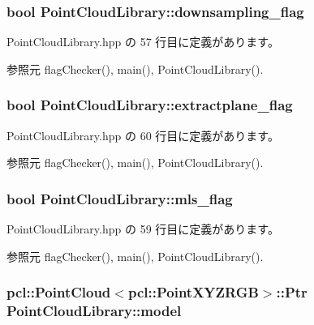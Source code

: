 \subsubsection[{downsampling\-\_\-flag}]{\setlength{\rightskip}{0pt plus 5cm}bool Point\-Cloud\-Library\-::downsampling\-\_\-flag}\label{class_point_cloud_library_a6bb70f323f325576a505c45edd1f2ebe}


 Point\-Cloud\-Library.\-hpp の 57 行目に定義があります。



参照元 flag\-Checker(), main(), Point\-Cloud\-Library().

\subsubsection[{extractplane\-\_\-flag}]{\setlength{\rightskip}{0pt plus 5cm}bool Point\-Cloud\-Library\-::extractplane\-\_\-flag}\label{class_point_cloud_library_a76c829d2feea3efcb84449a0c360ec43}


 Point\-Cloud\-Library.\-hpp の 60 行目に定義があります。



参照元 flag\-Checker(), main(), Point\-Cloud\-Library().

\subsubsection[{mls\-\_\-flag}]{\setlength{\rightskip}{0pt plus 5cm}bool Point\-Cloud\-Library\-::mls\-\_\-flag}\label{class_point_cloud_library_a0745fdcbdae44048793a4dce33dfeb4f}


 Point\-Cloud\-Library.\-hpp の 59 行目に定義があります。



参照元 flag\-Checker(), main(), Point\-Cloud\-Library().

\subsubsection[{model}]{\setlength{\rightskip}{0pt plus 5cm}pcl\-::\-Point\-Cloud$<$pcl\-::\-Point\-X\-Y\-Z\-R\-G\-B$>$\-::Ptr Point\-Cloud\-Library\-::model}\label{class_point_cloud_library_a9353ff5d5de9f4d0cc755c3f6bff8417}



